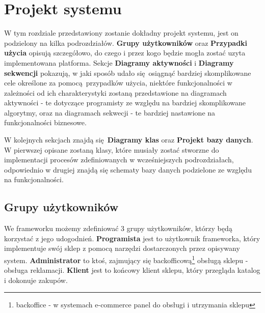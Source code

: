 
\chapter{Projekt systemu}
\thispagestyle{chapterBeginStyle}

W tym rozdziale przedstawiony zostanie dokładny projekt systemu, jest on podzielony na kilka podrozdziałów. \textbf{Grupy użytkowników} oraz \textbf{Przypadki użycia} opisują szczegółowo, do czego i przez kogo będzie mogła zostać uzyta implementowana platforma. Sekcje \textbf{Diagramy aktywności} i \textbf{Diagramy sekwencji} pokazują, w jaki sposób udało się osiągnąć bardziej skomplikowane cele określone za pomocą przypadków użycia, niektóre funkcjonalności w zależności od ich charakterystyki zostaną przedstawione na diagramach aktywności - te dotyczące programisty ze względu na bardziej skomplikowane algorytmy, oraz na diagramach sekwecji - te bardziej nastawione na funkcjonalności biznesowe.

W kolejnych sekcjach znajdą się \textbf{Diagramy klas} oraz \textbf{Projekt bazy danych}. W pierwszej opisane zostaną klasy, które musiały zostać stworzne do implementacji procesów zdefiniowanych w wcześniejszych podrozdziałach, odpowiednio w drugiej znajdą się schematy bazy danych podzielone ze względu na funkcjonalności.

\section{Grupy użytkowników}
We frameworku możemy zdefiniować 3 grupy użytkowników, którzy będą korzystać z jego udogodnień. \textbf{Programista} jest to użytkownik frameworka, który implementuje swój sklep z pomocą narzędzi dostarczonych przez opisywany system. \textbf{Administrator} to ktoś, zajmujący się backofficową\footnote{backoffice - w systemach e-commerce panel do obsługi i utrzymania sklepu} obsługą sklepu - obsługa reklamacji. \textbf{Klient} jest to końcowy klient sklepu, który przegląda katalog i dokonuje zakupów. 

